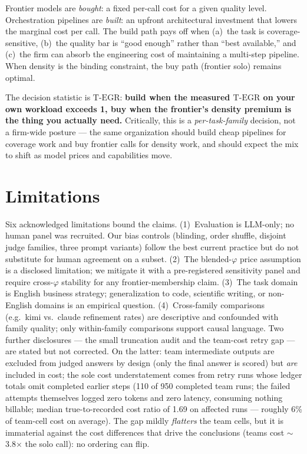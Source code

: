 \documentclass[12pt,a4paper]{article}
\newcommand{\phiBlend}{\varphi}
\newcommand{\TEGR}{\ensuremath{\text{T-EGR}}}
\begin{document}
Frontier models are \emph{bought}: a fixed per-call cost for a given quality
level. Orchestration pipelines are \emph{built}: an upfront architectural
investment that lowers the marginal cost per call. The build path pays off when
(a)~the task is coverage-sensitive, (b)~the quality bar is ``good enough'' rather
than ``best available,'' and (c)~the firm can absorb the engineering cost of
maintaining a multi-step pipeline. When density is the binding constraint, the buy
path (frontier solo) remains optimal.

The decision statistic is $\TEGR$: \textbf{build when the measured $\TEGR$ on your
own workload exceeds 1, buy when the frontier's density premium is the thing you
actually need.} Critically, this is a \emph{per-task-family} decision, not a
firm-wide posture --- the same organization should build cheap pipelines for
coverage work and buy frontier calls for density work, and should expect the mix
to shift as model prices and capabilities move.

\section{Limitations}\label{sec:limitations}

Six acknowledged limitations bound the claims. (1)~Evaluation is LLM-only; no
human panel was recruited. Our bias controls (blinding, order shuffle, disjoint
judge families, three prompt variants) follow the best current practice
\citep{ZhengEtAl2023, VergaEtAl2024} but do not substitute for human agreement
on a subset. (2)~The blended-$\phiBlend$ price assumption is a disclosed
limitation; we mitigate it with a pre-registered sensitivity panel and require
cross-$\phiBlend$ stability for any frontier-membership claim. (3)~The task
domain is English business strategy; generalization to code, scientific writing,
or non-English domains is an empirical question. (4)~Cross-family comparisons
(e.g.\ kimi vs.\ claude refinement rates) are descriptive and confounded with
family quality; only within-family comparisons support causal language. Two
further disclosures --- the small truncation audit and the team-cost retry gap
--- are stated but not corrected. On the latter: team intermediate outputs are
excluded from judged answers by design (only the final answer is scored) but
\emph{are} included in cost; the sole cost understatement comes from retry
runs whose ledger totals omit completed earlier steps (110 of 950 completed
team runs; the failed attempts themselves logged zero tokens and zero latency,
consuming nothing billable; median true-to-recorded cost ratio of 1.69 on
affected runs ---
roughly 6\% of team-cell cost on average). The gap mildly \emph{flatters} the
team cells, but it is immaterial against the cost differences that drive the
conclusions (teams cost $\sim$3.8$\times$ the solo call): no ordering can
flip.
\end{document}
